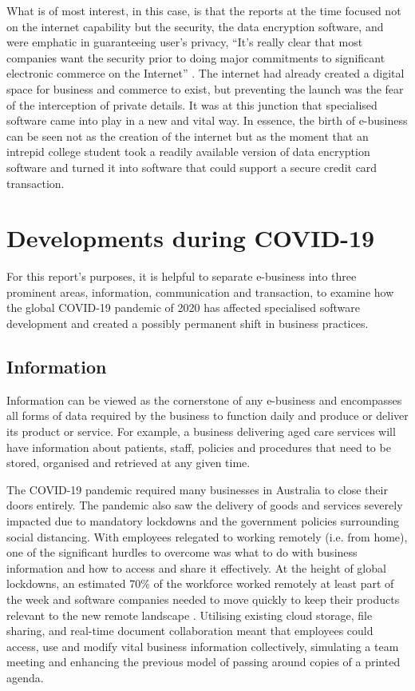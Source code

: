\documentclass[12pt]{article}
\begin{document}
What is of most interest, in this case, is that the reports at the time focused not on the internet capability but the security, the data encryption software, and were emphatic in guaranteeing user’s privacy, “It’s really clear that most companies want the security prior to doing major commitments to significant electronic commerce on the Internet” \cite{lewis}. The internet had already created a digital space for business and commerce to exist, but preventing the launch was the fear of the interception of private details. It was at this junction that specialised software came into play in a new and vital way. In essence, the birth of e-business can be seen not as the creation of the internet but as the moment that an intrepid college student took a readily available version of data encryption software and turned it into software that could support a secure credit card transaction.

\section{Developments during COVID-19}
For this report’s purposes, it is helpful to separate e-business into three prominent areas, information, communication and transaction, to examine how the global COVID-19 pandemic of 2020 has affected specialised software development and created a possibly permanent shift in business practices. \par 

\subsection{Information}
Information can be viewed as the cornerstone of any e-business and encompasses all forms of data required by the business to function daily and produce or deliver its product or service. For example, a business delivering aged care services will have information about patients, staff, policies and procedures that need to be stored, organised and retrieved at any given time. \par 

The COVID-19 pandemic required many businesses in Australia to close their doors entirely. The pandemic also saw the delivery of goods and services severely impacted due to mandatory lockdowns and the government policies surrounding social distancing. With employees relegated to working remotely (i.e. from home), one of the significant hurdles to overcome was what to do with business information and how to access and share it effectively. At the height of global lockdowns, an estimated 70\% of the workforce worked remotely at least part of the week and software companies needed to move quickly to keep their products relevant to the new remote landscape \cite{diamond}. Utilising existing cloud storage, file sharing, and real-time document collaboration meant that employees could access, use and modify vital business information collectively, simulating a team meeting and enhancing the previous model of passing around copies of a printed agenda. \par 
\end{document}
